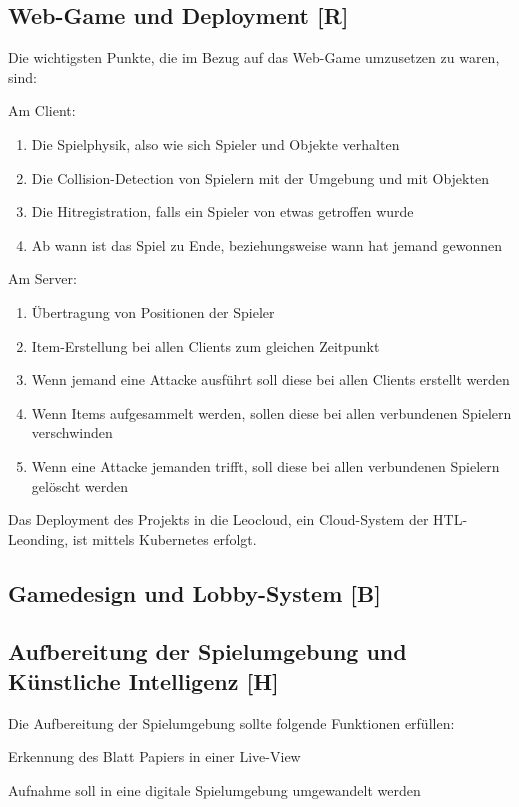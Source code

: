 \subsection{Web-Game und Deployment [R]}
Die wichtigsten Punkte, die im Bezug auf das Web-Game umzusetzen zu waren, sind:
\begin{compactitem}
    \item Am Client:
    \begin{enumerate}
        \item Die Spielphysik, also wie sich Spieler und Objekte verhalten
        \item Die Collision-Detection von Spielern mit der Umgebung und mit Objekten
        \item Die Hitregistration, falls ein Spieler von etwas getroffen wurde
        \item Ab wann ist das Spiel zu Ende, beziehungsweise wann hat jemand gewonnen
    \end{enumerate}
    \item Am Server:
    \begin{enumerate}
        \item Übertragung von Positionen der Spieler
        \item Item-Erstellung bei allen Clients zum gleichen Zeitpunkt
        \item Wenn jemand eine Attacke ausführt soll diese bei allen Clients erstellt werden
        \item Wenn Items aufgesammelt werden, sollen diese bei allen verbundenen Spielern verschwinden
        \item Wenn eine Attacke jemanden trifft, soll diese bei allen verbundenen Spielern gelöscht werden
    \end{enumerate}

\end{compactitem}
Das Deployment des Projekts in die Leocloud, ein Cloud-System der HTL-Leonding, ist mittels Kubernetes erfolgt.


\subsection{Gamedesign und Lobby-System [B]}

\subsection{Aufbereitung der Spielumgebung und Künstliche Intelligenz [H]}
Die Aufbereitung der Spielumgebung sollte folgende Funktionen erfüllen:
\begin{compactitem}
    \item Erkennung des Blatt Papiers in einer Live-View
    \item Aufnahme soll in eine digitale Spielumgebung umgewandelt werden
\end{compactitem}

